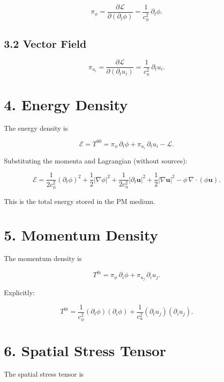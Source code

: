 \documentclass{article}
\begin{document}
\[
\pi_\phi
=
\frac{\partial \mathcal{L}}{\partial(\partial_t \phi)}
=
\frac{1}{c_\phi^2}\,\partial_t \phi.
\]



\subsection*{3.2 Vector Field}



\[
\pi_{u_i}
=
\frac{\partial \mathcal{L}}{\partial(\partial_t u_i)}
=
\frac{1}{c_u^2}\,\partial_t u_i.
\]



\section*{4. Energy Density}

The energy density is


\[
\mathcal{E}
=
T^{00}
=
\pi_\phi\,\partial_t \phi
+
\pi_{u_i}\,\partial_t u_i
- \mathcal{L}.
\]



Substituting the momenta and Lagrangian (without sources):


\[
\mathcal{E}
=
\frac{1}{2c_\phi^2}(\partial_t \phi)^2
+ \frac{1}{2}|\nabla \phi|^2
+
\frac{1}{2c_u^2}|\partial_t \mathbf u|^2
+ \frac{1}{2}|\nabla \mathbf u|^2
- \phi\,\nabla\cdot(\phi\mathbf u).
\]



This is the total energy stored in the PM medium.

\section*{5. Momentum Density}

The momentum density is


\[
T^{0i}
=
\pi_\phi\,\partial_i \phi
+
\pi_{u_j}\,\partial_i u_j.
\]



Explicitly:


\[
T^{0i}
=
\frac{1}{c_\phi^2}(\partial_t \phi)(\partial_i \phi)
+
\frac{1}{c_u^2}(\partial_t u_j)(\partial_i u_j).
\]



\section*{6. Spatial Stress Tensor}

The spatial stress tensor is
\end{document}
